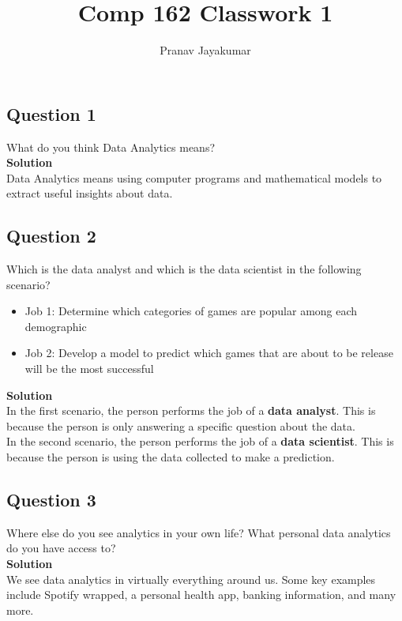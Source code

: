 \documentclass[12pt]{article}
\title{Comp 162 Classwork 1}
\author{Pranav Jayakumar}
\begin{document}
\maketitle

\subsection*{Question 1}
What do you think Data Analytics means?\\ 

\textbf{Solution}\\ 

Data Analytics means using computer programs and mathematical models to extract useful insights about data. 
\vspace{0.25in}
\subsection*{Question 2}
Which is the data analyst and which is the data scientist in the following scenario?\\ 

\begin{itemize}
  \item Job 1: Determine which categories of games are popular among each demographic
  \item Job 2: Develop a model to predict which games that are about to be release will be the most successful
\end{itemize} 

\textbf{Solution}\\ 

In the first scenario, the person performs the job of a \textbf{data analyst}. This is because the person is only answering a specific question about the data.\\ 

In the second scenario, the person performs the job of a \textbf{data scientist}. This is because the person is using the data collected to make a prediction. \\ 
\vspace{0.25in}
\subsection*{Question 3}
Where else do you see analytics in your own life? What personal data analytics do you have access to?\\ 

\textbf{Solution}\\ 
We see data analytics in virtually everything around us. Some key examples include Spotify wrapped, a personal health app, banking information, and many more.
\vspace{0.25in}
\end{document}

